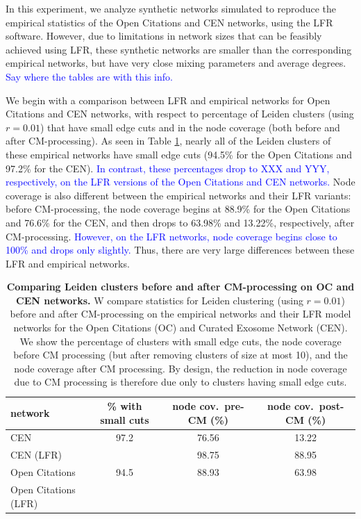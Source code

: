 \documentclass[11pt]{article}   	%
\begin{document}
In this experiment, we analyze synthetic networks simulated to reproduce the empirical statistics of the Open Citations and CEN networks, using the
LFR software.
However, due to limitations in network sizes that can be feasibly achieved using LFR, these synthetic networks are smaller than the corresponding
empirical networks, but have very close mixing parameters and average degrees.
\textcolor{blue}{Say where the tables are with this info.}


We begin with a comparison  between LFR and empirical networks for Open Citations and CEN networks, with respect to percentage of  Leiden clusters (using $r=0.01$) that have small edge cuts and in
the node coverage (both before and after CM-processing).   As seen in
Table \ref{tab:LFR-vs-empirical-OC-CEN}, nearly all of the Leiden clusters of these empirical networks have small edge cuts (94.5\% for the Open Citations and 97.2\% for the CEN).
\textcolor{blue}{In contrast, these percentages drop to XXX and YYY, respectively, on the LFR versions of the Open Citations and CEN networks.}
Node coverage is also different between the empirical networks and their LFR variants: before CM-processing, the node coverage begins at 88.9\% for the Open Citations and 76.6\% for the CEN, and then drops to 63.98\% and 13.22\%, respectively, after CM-processing. 
\textcolor{blue}{However, on the LFR networks, node coverage begins close to 100\% and drops only slightly.}
Thus, there are very large differences between these LFR and empirical networks.

\begin{table}[ht]
\centering
\begin{tabular}{lccc}
  \hline
 network & \% with small cuts & node cov.~pre-CM (\%) & node cov.~post-CM (\%) \\
   \hline
   CEN  &97.2 &76.56 &13.22 \\
   CEN (LFR) &  & 98.75 & 88.95\\
   \hline
   Open Citations  &94.5&88.93&63.98 \\
   Open Citations (LFR) &&&\\
   \hline
\end{tabular}
\caption{\textbf{Comparing Leiden clusters before and after CM-processing  on   OC and CEN networks.} W compare statistics for Leiden clustering (using $r=0.01$) before and after CM-processing on the empirical networks and their LFR model
networks for the Open Citations (OC)  and Curated Exosome Network (CEN). We show the percentage of clusters with small edge cuts, the node coverage before CM processing (but after removing clusters of size at most 10), and the node coverage
after CM processing.  By design, the reduction in node coverage due to CM processing  is therefore due only to clusters having small edge cuts.}
\label{tab:LFR-vs-empirical-OC-CEN}
\end{table}
\end{document}
